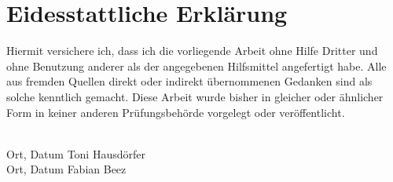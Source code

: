 \vspace*{4cm}
\section*{Eidesstattliche Erklärung}
Hiermit versichere ich, dass ich die vorliegende Arbeit
ohne Hilfe Dritter und ohne Benutzung anderer als der angegebenen
Hilfsmittel angefertigt habe. Alle aus fremden Quellen direkt oder
indirekt übernommenen Gedanken sind als solche kenntlich gemacht. Diese
Arbeit wurde bisher in gleicher oder ähnlicher Form in keiner anderen
Prüfungsbehörde vorgelegt oder veröffentlicht.

\vfill
\noindent\dotfill\\
\hspace{2cm} Ort, Datum \hfill Toni Hausdörfer
\vfill
\noindent\dotfill\\
\hspace{2cm} Ort, Datum \hfill Fabian Beez 

\vfill\vfill\vfill\vfill\vfill
\newpage
